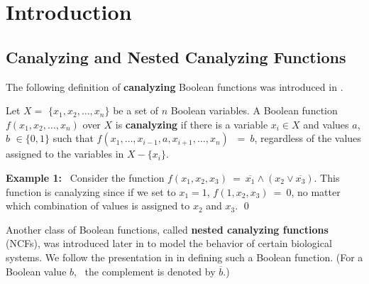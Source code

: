 \section{Introduction} 
\label{sec:intro}

\subsection{Canalyzing and Nested Canalyzing Functions}
\label{sse:ncf_def}

The following definition of \textbf{canalyzing} Boolean functions was introduced
in \cite{Kauffman-1969}.

\begin{definition}\label{def:canalyzing}
Let $X = $ $\{x_1, x_2, \ldots, x_n\}$ be a set of $n$  Boolean variables.
A Boolean function $f(x_1, x_2, \ldots, x_n)$ over $X$ is \textbf{canalyzing}
if there is a variable $x_i \in X$ and values $a$, $b$ $\in \{0,1\}$ such that 
$f(x_1, \ldots, x_{i-1}, a, x_{i+1}, \ldots, x_n)$ $~=~ b$, regardless of the values
assigned to the variables in $X - \{x_i\}$.
\end{definition}

\medskip

\noindent
\textbf{Example 1:}~ Consider the function 
$f(x_1, x_2, x_3) ~=~ \overline{x_1} \wedge (x_2 \vee \overline{x_3})$.
This function is canalyzing since if we set to $x_1 = 1$,
$f(1, x_2, x_3) ~=~ 0$, no matter which combination of values is assigned 
to $x_2$ and $x_3$. \qed

\medskip

Another class of Boolean functions, called \textbf{nested canalyzing functions} (NCFs),
was introduced later in \cite{Kauffman-etal-2003} to model the behavior of
certain biological systems.
We follow the presentation in \cite{Layne-2011} in defining 
such a Boolean function. 
(For a Boolean value $b$,~ the complement is denoted by $\overline{b}$.)

